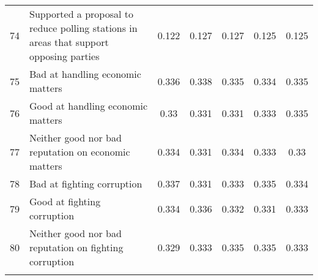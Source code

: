 \begin{longtable}{lp{7cm}ccccc}
  74 & Supported a proposal to reduce polling stations in areas that support opposing parties & 0.122 & 0.127 & 0.127 & 0.125 & 0.125 \\ 
  75 & Bad at handling economic matters & 0.336 & 0.338 & 0.335 & 0.334 & 0.335 \\ 
  76 & Good at handling economic matters & 0.33 & 0.331 & 0.331 & 0.333 & 0.335 \\ 
  77 & Neither good nor bad reputation on economic matters & 0.334 & 0.331 & 0.334 & 0.333 & 0.33 \\ 
  78 & Bad at fighting corruption & 0.337 & 0.331 & 0.333 & 0.335 & 0.334 \\ 
  79 & Good at fighting corruption & 0.334 & 0.336 & 0.332 & 0.331 & 0.333 \\ 
  80 & Neither good nor bad reputation on fighting corruption & 0.329 & 0.333 & 0.335 & 0.335 & 0.333 \\ 
   \bottomrule
\label{table_sa1}
\end{longtable}
